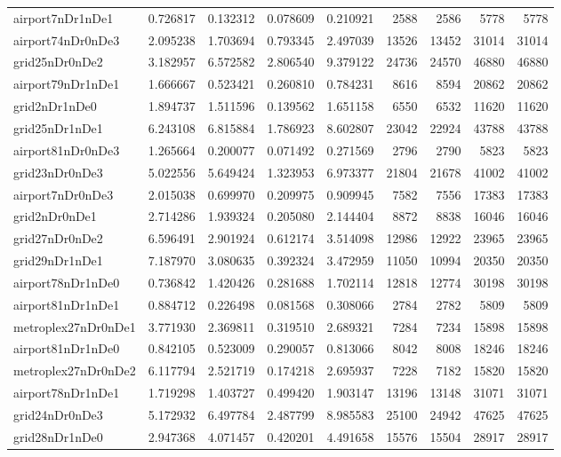 \begin{longtable}{|l|r|r|r|r|r|r|r|r|}
airport7nDr1nDe1 & 0.726817 & 0.132312 & 0.078609 & 0.210921 & 2588 & 2586 & 5778 & 5778 \\
airport74nDr0nDe3 & 2.095238 & 1.703694 & 0.793345 & 2.497039 & 13526 & 13452 & 31014 & 31014 \\
grid25nDr0nDe2 & 3.182957 & 6.572582 & 2.806540 & 9.379122 & 24736 & 24570 & 46880 & 46880 \\
airport79nDr1nDe1 & 1.666667 & 0.523421 & 0.260810 & 0.784231 & 8616 & 8594 & 20862 & 20862 \\
grid2nDr1nDe0 & 1.894737 & 1.511596 & 0.139562 & 1.651158 & 6550 & 6532 & 11620 & 11620 \\
grid25nDr1nDe1 & 6.243108 & 6.815884 & 1.786923 & 8.602807 & 23042 & 22924 & 43788 & 43788 \\
airport81nDr0nDe3 & 1.265664 & 0.200077 & 0.071492 & 0.271569 & 2796 & 2790 & 5823 & 5823 \\
grid23nDr0nDe3 & 5.022556 & 5.649424 & 1.323953 & 6.973377 & 21804 & 21678 & 41002 & 41002 \\
airport7nDr0nDe3 & 2.015038 & 0.699970 & 0.209975 & 0.909945 & 7582 & 7556 & 17383 & 17383 \\
grid2nDr0nDe1 & 2.714286 & 1.939324 & 0.205080 & 2.144404 & 8872 & 8838 & 16046 & 16046 \\
grid27nDr0nDe2 & 6.596491 & 2.901924 & 0.612174 & 3.514098 & 12986 & 12922 & 23965 & 23965 \\
grid29nDr1nDe1 & 7.187970 & 3.080635 & 0.392324 & 3.472959 & 11050 & 10994 & 20350 & 20350 \\
airport78nDr1nDe0 & 0.736842 & 1.420426 & 0.281688 & 1.702114 & 12818 & 12774 & 30198 & 30198 \\
airport81nDr1nDe1 & 0.884712 & 0.226498 & 0.081568 & 0.308066 & 2784 & 2782 & 5809 & 5809 \\
metroplex27nDr0nDe1 & 3.771930 & 2.369811 & 0.319510 & 2.689321 & 7284 & 7234 & 15898 & 15898 \\
airport81nDr1nDe0 & 0.842105 & 0.523009 & 0.290057 & 0.813066 & 8042 & 8008 & 18246 & 18246 \\
metroplex27nDr0nDe2 & 6.117794 & 2.521719 & 0.174218 & 2.695937 & 7228 & 7182 & 15820 & 15820 \\
airport78nDr1nDe1 & 1.719298 & 1.403727 & 0.499420 & 1.903147 & 13196 & 13148 & 31071 & 31071 \\
grid24nDr0nDe3 & 5.172932 & 6.497784 & 2.487799 & 8.985583 & 25100 & 24942 & 47625 & 47625 \\
grid28nDr1nDe0 & 2.947368 & 4.071457 & 0.420201 & 4.491658 & 15576 & 15504 & 28917 & 28917 \\

\end{longtable}
